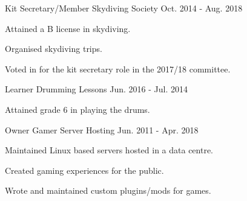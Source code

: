 

\begin{cventries}

  \cventry
    {Kit Secretary/Member} %
    {Skydiving Society} %
    {} %
    {Oct. 2014 - Aug. 2018} %
    {
      \begin{cvitems} %
        \item {Attained a B license in skydiving.}
        \item {Organised skydiving trips.}
        \item {Voted in for the kit secretary role in the 2017/18 committee.}
      \end{cvitems}
    }

  \cventry
    {Learner} %
    {Drumming Lessons} %
    {} %
    {Jun. 2016 - Jul. 2014} %
    {
      \begin{cvitems} %
        \item {Attained grade 6 in playing the drums.}
      \end{cvitems}
    }

  \cventry
    {Owner} %
    {Gamer Server Hosting} %
    {} %
    {Jun. 2011 - Apr. 2018} %
    {
      \begin{cvitems} %
        \item {Maintained Linux based servers hosted in a data centre.}
        \item {Created gaming experiences for the public.}
        \item {Wrote and maintained custom plugins/mods for games.}
      \end{cvitems}
    }

\end{cventries}
